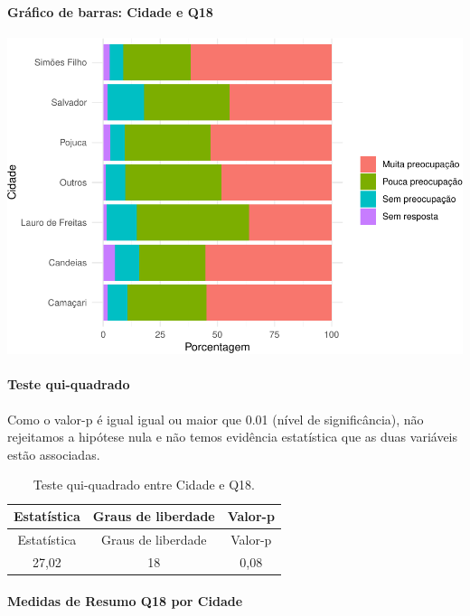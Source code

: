 \documentclass[]{article}
\let\oldparagraph\paragraph
\renewcommand{\paragraph}[1]{\oldparagraph{#1}\mbox{}}
\begin{document}
\hypertarget{gruxe1fico-de-barras-cidade-e-q18}{%
\paragraph{Gráfico de barras: Cidade e Q18}\label{gruxe1fico-de-barras-cidade-e-q18}}

\begin{center}\includegraphics[width=0.75\linewidth]{relatorio_covid19_files/figure-latex/unnamed-chunk-250-1} \end{center}

\hypertarget{teste-qui-quadrado-22}{%
\paragraph{Teste qui-quadrado}\label{teste-qui-quadrado-22}}

Como o valor-p é igual igual ou maior que 0.01 (nível de significância), não rejeitamos a hipótese nula e não temos evidência estatística que as duas variáveis estão associadas.

\begin{longtable}[]{@{}ccc@{}}
\caption{\label{tab:unnamed-chunk-252}Teste qui-quadrado entre Cidade e Q18.}\tabularnewline
\toprule
Estatística & Graus de liberdade & Valor-p\tabularnewline
\midrule
\endfirsthead
\toprule
Estatística & Graus de liberdade & Valor-p\tabularnewline
\midrule
\endhead
27,02 & 18 & 0,08\tabularnewline
\bottomrule
\end{longtable}

\cleardoublepage

\hypertarget{medidas-de-resumo-q18-por-cidade}{%
\paragraph{Medidas de Resumo Q18 por Cidade}\label{medidas-de-resumo-q18-por-cidade}}
\end{document}
